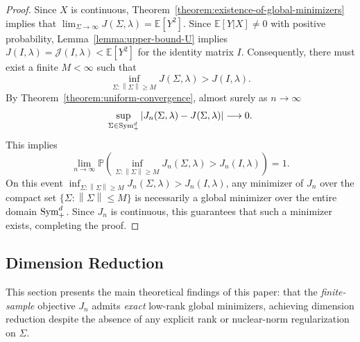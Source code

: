 \documentclass[sn-mathphys-num]{sn-jnl}%
\numberwithin{equation}{section}
\newcommand{\E}{\mathbb{E}}
\newcommand{\norm}[1]{\left\|{#1}\right\|} %
\renewcommand{\P}{\mathbb{P}}
\newcommand{\Sym}{{\rm \mathrm{Sym}}}
\theoremstyle{thmstyleone}%
\theoremstyle{thmstyletwo}%
\theoremstyle{thmstylethree}%
\begin{document}
\begin{proof} 
Since $X$ is continuous, Theorem~\ref{theorem:existence-of-global-minimizers} implies that $\lim_{\Sigma \to \infty} J(\Sigma, \lambda) = \E[Y^2]$.  
Since $\E[Y|X] \neq 0$ with positive probability, Lemma~\ref{lemma:upper-bound-U} implies 
$J(I, \lambda) = \mathcal{J}(I,\lambda) < \E[Y^2]$ for the identity matrix $I$. Consequently, there must exist a finite 
$M < \infty$ such that 
\begin{equation*}
	\inf_{\Sigma: \norm{\Sigma} \ge M} J(\Sigma, \lambda) > J(I, \lambda).
\end{equation*}
By Theorem~\ref{theorem:uniform-convergence}, almost surely as $n \to \infty$
\begin{equation*}
	\sup_{\Sigma \in \Sym_+^d} |J_n(\Sigma, \lambda) - J(\Sigma, \lambda)| \longrightarrow 0.
\end{equation*} 
This implies 
\begin{equation*}
	\lim_{n \to \infty} \P\left(\inf_{\Sigma: \norm{\Sigma} \ge M} J_n(\Sigma, \lambda) > J_n(I, \lambda)\right) = 1.
\end{equation*} 
On this event $\inf_{\Sigma: \norm{\Sigma} \ge M} J_n(\Sigma, \lambda) > J_n(I, \lambda)$, any minimizer of $J_n$ 
over the compact set $\{\Sigma: \norm{\Sigma} \le M\}$ is necessarily a global minimizer over the entire domain $\Sym_+^d$. 
Since $J_n$ is continuous, this guarantees that such a minimizer exists, completing the proof. %
\end{proof} 




\vspace{.5em} 


\subsection{Dimension Reduction} 

\indent\indent
This section presents the main theoretical findings of this paper: that the \emph{finite-sample} 
objective $J_n$ admits \emph{exact} low-rank global minimizers, achieving dimension reduction 
despite the absence of any explicit rank or nuclear-norm regularization on $\Sigma$. 
\end{document}
